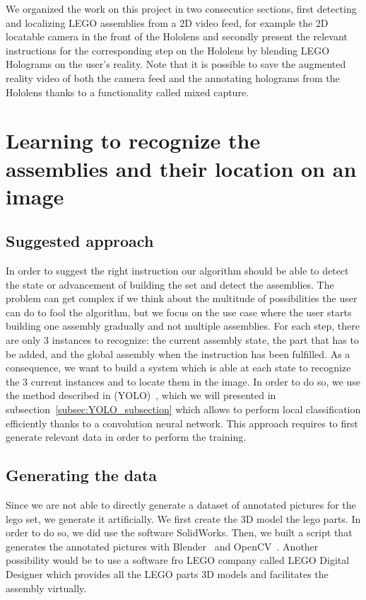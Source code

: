 \documentclass[10pt,twocolumn,letterpaper]{article}
\begin{document}
We organized the work on this project in two consecutice sections, first detecting and localizing LEGO assemblies from a 2D video feed, for example the 2D locatable camera in the front of the Hololens and secondly present the relevant instructions for the corresponding step on the Hololens by blending LEGO Holograms on the user's reality. Note that it is possible to save the augmented reality video of both the camera feed and the annotating holograms from the Hololens thanks to a functionality called mixed capture. 

\section{Learning to recognize the assemblies and their location on an image}

\subsection{Suggested approach}

In order to suggest the right instruction our algorithm should be able to detect the state or advancement of building the set and detect the assemblies. The problem can get complex if we think about the multitude of possibilities the user can do to fool the algorithm, but we focus on the use case where the user starts building one assembly gradually and not multiple assemblies. For each step, there are only 3 instances to recognize: the current assembly state, the part that has to be added, and the global assembly when the instruction has been fulfilled. As a consequence, we want to build a system which is able at each state to recognize the 3 current instances and to locate them in the image.
\medbreak
In order to do so, we use the method described in (YOLO)~\cite{redmon_you_2015}, which we will presented in subsection~\ref{subsec:YOLO_subsection} which allows to perform local classification efficiently thanks to a convolution neural network. This approach requires to first generate relevant data in order to perform the training.

\subsection{Generating the data}

Since we are not able to directly generate a dataset of annotated pictures for the lego set, we generate it artificially. We first create the 3D model the lego parts. In order to do so, we did use the software SolidWorks. Then, we built a script that generates the annotated pictures with Blender~\cite{blender} and OpenCV~\cite{opencv_library}. Another possibility would be to use a software fro LEGO company called LEGO Digital Designer which provides all the LEGO parts 3D models and facilitates the assembly virtually.
\end{document}
